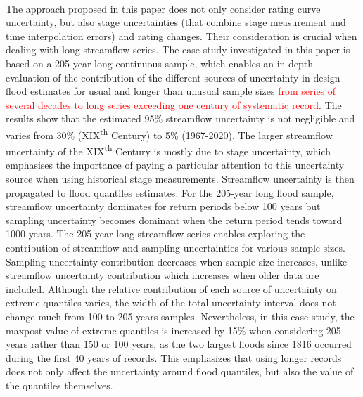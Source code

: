 \documentclass[11pt]{article}
\begin{document}
    \paragraph{}
    The approach proposed in this paper does not only consider rating curve uncertainty, but also stage uncertainties (that combine stage measurement and time interpolation errors) and rating changes. Their consideration is crucial when dealing with long streamflow series. The case study investigated in this paper is based on a 205-year long continuous sample, which enables an in-depth evaluation of the contribution of the different sources of uncertainty in design flood estimates \sout{for usual and longer than unusual sample sizes} \textcolor{red}{from series of several decades to long series exceeding one century of systematic record}. The results show that the estimated 95\% streamflow uncertainty is not negligible and varies from 30\% (XIX\textsuperscript{th} Century) to 5\% (1967-2020). The larger streamflow uncertainty of the XIX\textsuperscript{th} Century is mostly due to stage uncertainty, which emphasises the importance of paying a particular attention to this uncertainty source when using historical stage measurements. Streamflow uncertainty is then propagated to flood quantiles estimates. For the 205-year long flood sample, streamflow uncertainty dominates for return periods below 100 years but sampling uncertainty becomes dominant when the return period tends toward 1000 years. The 205-year long streamflow series enables exploring the contribution of streamflow and sampling uncertainties for various sample sizes. Sampling uncertainty contribution decreases when sample size increases, unlike streamflow uncertainty contribution which increases when older data are included. Although the relative contribution of each source of uncertainty on extreme quantiles varies, the width of the total uncertainty interval does not change much from 100 to 205 years samples. Nevertheless, in this case study, the maxpost value of extreme quantiles is increased by 15\% when considering 205 years rather than 150 or 100 years, as the two largest floods since 1816 occurred during the first 40 years of records. This emphasizes that using longer records does not only affect the uncertainty around flood quantiles, but also the value of the quantiles themselves. 
\end{document}
